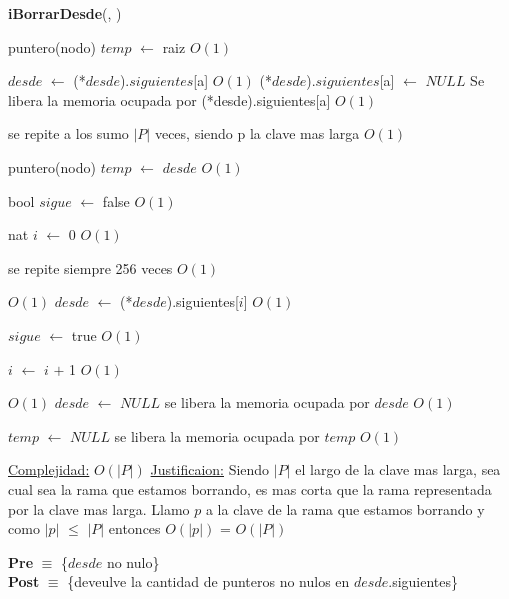 \begin{Algoritmos}
 
\begin{algorithm}[H]
{\textbf{iBorrarDesde}(}, )
\begin{algorithmic}[1]

\State puntero(nodo) $temp$ $\gets$ raiz \Comment $O(1)$

\State $desde$ $\gets$ (*$desde$).$siguientes$[a] \Comment $O(1)$
\State (*$desde$).$siguientes$[a] $\gets$ $NULL$ \Comment Se libera la memoria ocupada por (*desde).siguientes[a] $O(1)$

 \Comment se repite a los sumo $|P|$ veces, siendo p la clave mas larga $O(1)$

	\State puntero(nodo) $temp$ $\gets$ $desde$ \Comment $O(1)$

	\State bool $sigue$ $\gets$ false \Comment $O(1)$

	\State nat $i$ $\gets$ 0 \State $O(1)$

	 \Comment se repite siempre 256 veces $O(1)$

		 \Comment $O(1)$
			\State $desde$ $\gets$ (*$desde$).siguientes[$i$] \Comment $O(1)$		
		
			\State $sigue$ $\gets$ true \Comment $O(1)$		
		
		\EndIf
		\State $i$ $\gets$ $i$ $+$ 1 \Comment $O(1)$

	\EndWhile

\EndWhile

 \Comment $O(1)$
	\State $desde$ $\gets$ $NULL$ \Comment se libera la memoria ocupada por $desde$ $O(1)$

\EndIf

\State $temp$ $\gets$ $NULL$ \Comment se libera la memoria ocupada por $temp$ $O(1)$


\medskip
\State \underline{Complejidad:} $O(|P|)$
\State \underline{Justificaion:} Siendo $|P|$ el largo de la clave mas larga, sea cual sea la rama que estamos borrando, es mas corta que la rama representada por la clave mas larga. Llamo $p$ a la clave de la rama que estamos borrando y como $|p|$ $\leq$ $|P|$ entonces $O(|p|)$ = $O(|P|)$ 

\end{algorithmic}
\end{algorithm}
  
 

\textbf{Pre} $\equiv$ \{$desde$ no nulo\}\\%
\textbf{Post} $\equiv$ \{deveulve la cantidad de punteros no nulos en $desde$.siguientes\}%


\end{Algoritmos}
